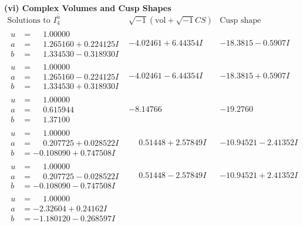 \documentclass[1p]{elsarticle_modified}
\theoremstyle{definition}
\newcommand{\I}{\sqrt{-1}}
\begin{document}
\newpage\flushleft \textbf{(vi) Complex Volumes and Cusp Shapes}
$$\begin{array}{c|c|c}  
\text{Solutions to }I^u_{4}& \I (\text{vol} + \sqrt{-1}CS) & \text{Cusp shape}\\
 \hline 
\begin{aligned}
u &= \phantom{-}1.00000\phantom{ +0.000000I} \\
a &= \phantom{-}1.265160 + 0.224125 I \\
b &= \phantom{-}1.334530 - 0.318930 I\end{aligned}
 & -4.02461 + 6.44354 I & -18.3815 - 0.5907 I \\ \hline\begin{aligned}
u &= \phantom{-}1.00000\phantom{ +0.000000I} \\
a &= \phantom{-}1.265160 - 0.224125 I \\
b &= \phantom{-}1.334530 + 0.318930 I\end{aligned}
 & -4.02461 - 6.44354 I & -18.3815 + 0.5907 I \\ \hline\begin{aligned}
u &= \phantom{-}1.00000\phantom{ +0.000000I} \\
a &= \phantom{-}0.615944\phantom{ +0.000000I} \\
b &= \phantom{-}1.37100\phantom{ +0.000000I}\end{aligned}
 & -8.14766\phantom{ +0.000000I} & -19.2760\phantom{ +0.000000I} \\ \hline\begin{aligned}
u &= \phantom{-}1.00000\phantom{ +0.000000I} \\
a &= \phantom{-}0.207725 + 0.028522 I \\
b &= -0.108090 + 0.747508 I\end{aligned}
 & \phantom{-}0.51448 + 2.57849 I & -10.94521 - 2.41352 I \\ \hline\begin{aligned}
u &= \phantom{-}1.00000\phantom{ +0.000000I} \\
a &= \phantom{-}0.207725 - 0.028522 I \\
b &= -0.108090 - 0.747508 I\end{aligned}
 & \phantom{-}0.51448 - 2.57849 I & -10.94521 + 2.41352 I \\ \hline\begin{aligned}
u &= \phantom{-}1.00000\phantom{ +0.000000I} \\
a &= -2.32604 + 0.24162 I \\
b &= -1.180120 - 0.268597 I\end{aligned}

\end{array}$$
\end{document}
